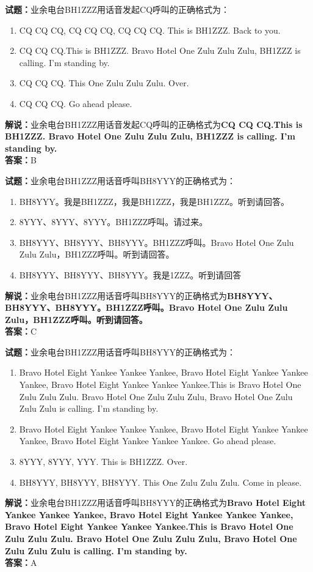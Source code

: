 \documentclass{ctexbook}
\begin{document}
\bigskip


\noindent\textbf{试题：}业余电台BH1ZZZ用话音发起CQ呼叫的正确格式为：
\begin{enumerate}[leftmargin=3em]
	\item CQ CQ CQ, CQ CQ CQ, CQ CQ CQ. This is BH1ZZZ. Back to you.
	\item CQ CQ CQ.This is BH1ZZZ. Bravo Hotel One Zulu Zulu Zulu, BH1ZZZ is calling. I’m standing by.
	\item CQ CQ CQ. This One Zulu Zulu Zulu. Over.
	\item CQ CQ CQ. Go ahead please.
\end{enumerate}
\noindent\textbf{解说：}业余电台BH1ZZZ用话音发起CQ呼叫的正确格式为\textbf{CQ CQ CQ.This is BH1ZZZ. Bravo Hotel One Zulu Zulu Zulu, BH1ZZZ is calling. I’m standing by.}\\\noindent\textbf{答案：}B


\bigskip


\noindent\textbf{试题：}业余电台BH1ZZZ用话音呼叫BH8YYY的正确格式为：
\begin{enumerate}[leftmargin=3em]
	\item BH8YYY。我是BH1ZZZ，我是BH1ZZZ，我是BH1ZZZ。听到请回答。
	\item 8YYY、8YYY、8YYY。BH1ZZZ呼叫。请过来。
	\item BH8YYY、BH8YYY、BH8YYY。BH1ZZZ呼叫。Bravo Hotel One Zulu Zulu Zulu，BH1ZZZ呼叫。听到请回答。
	\item BH8YYY、BH8YYY、BH8YYY。我是1ZZZ。听到请回答
\end{enumerate}
\noindent\textbf{解说：}业余电台BH1ZZZ用话音呼叫BH8YYY的正确格式为\textbf{BH8YYY、BH8YYY、BH8YYY。BH1ZZZ呼叫。Bravo Hotel One Zulu Zulu Zulu，BH1ZZZ呼叫。听到请回答。}\\\noindent\textbf{答案：}C


\bigskip


\noindent\textbf{试题：}业余电台BH1ZZZ用话音呼叫BH8YYY的正确格式为：
\begin{enumerate}[leftmargin=3em]
	\item Bravo Hotel Eight Yankee Yankee Yankee, Bravo Hotel Eight Yankee Yankee Yankee, Bravo Hotel Eight Yankee Yankee Yankee.This is Bravo Hotel One Zulu Zulu Zulu. Bravo Hotel One Zulu Zulu Zulu, Bravo Hotel One Zulu Zulu Zulu is calling. I’m standing by.
	\item Bravo Hotel Eight Yankee Yankee Yankee, Bravo Hotel Eight Yankee Yankee Yankee, Bravo Hotel Eight Yankee Yankee Yankee. Go ahead please.
	\item 8YYY, 8YYY, YYY. This is BH1ZZZ. Over.
	\item BH8YYY, BH8YYY, BH8YYY. This One Zulu Zulu Zulu. Come in please.
\end{enumerate}
\noindent\textbf{解说：}业余电台BH1ZZZ用话音呼叫BH8YYY的正确格式为\textbf{Bravo Hotel Eight Yankee Yankee Yankee, Bravo Hotel Eight Yankee Yankee Yankee, Bravo Hotel Eight Yankee Yankee Yankee.This is Bravo Hotel One Zulu Zulu Zulu. Bravo Hotel One Zulu Zulu Zulu, Bravo Hotel One Zulu Zulu Zulu is calling. I’m standing by.}\\\noindent\textbf{答案：}A
\end{document}
